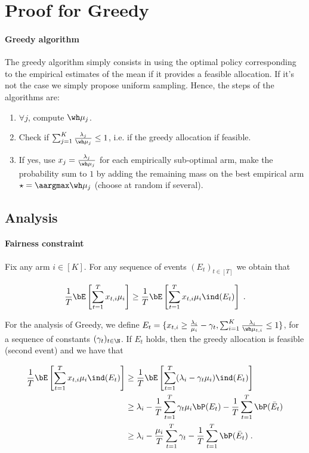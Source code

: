 \section{Proof for Greedy}

\paragraph{Greedy algorithm} The greedy algorithm simply consists in using the optimal policy corresponding to the empirical estimates of the mean if it provides a feasible allocation. If it's not the case we simply propose uniform sampling. Hence, the steps of the algorithms are: 
\begin{enumerate}
	\item $\forall j$, compute $\wh \mu_j$.
	\item Check if $\sum_{j=1}^K \frac{\lambda_j}{\wh \mu_j} \leq  1$, i.e. if the greedy allocation if feasible.
	\item If yes, use $x_j=\frac{\lambda_j}{\wh \mu_j}$ for each empirically sub-optimal arm, make the probability sum to $1$ by adding the remaining mass on the best empirical arm $\star = \aargmax \wh \mu_j$ (choose at random if several).
\end{enumerate}


\subsection{Analysis}

\paragraph{Fairness constraint} Fix any arm $i \in [K]$. For any sequence of events $(E_t)_{t\in[T]}$ we obtain that 

\begin{align*} 
\frac{1}{T} \bE\left[\sum_{t=1}^T x_{t,i} \mu_i \right] \geq 
\frac{1}{T} \bE\left[\sum_{t=1}^T x_{t,i} \mu_i \ind(E_t) \right]\;.
\end{align*}

For the analysis of Greedy, we define $E_t = \{x_{t,i} \geq \frac{\lambda_i}{\mu_i}-\gamma_t, \sum_{i=1}^K \frac{\lambda_i}{\wh \mu_{t, i}}\leq 1 \}$, for a sequence of constants $(\gamma_t)_{t \in \N}$. If $E_t$ holds, then the greedy allocation is feasible (second event) and we have that 

\begin{align*}  
\frac{1}{T} \bE\left[\sum_{t=1}^T x_{t,i} \mu_i \ind(E_t) \right] &\geq \frac{1}{T} \bE\left[\sum_{t=1}^T (\lambda_i - \gamma_t \mu_i) \ind(E_t) \right] \\
& \geq  \lambda_i - \frac{1}{T} \sum_{t=1}^T \gamma_t \mu_i \bP(E_t) - \frac{1}{T} \sum_{t=1}^T \bP(\bar E_t) \\
& \geq  \lambda_i - \frac{\mu_i}{T} \sum_{t=1}^T \gamma_t - \frac{1}{T} \sum_{t=1}^T  \bP(\bar E_t)\;.
\end{align*}

